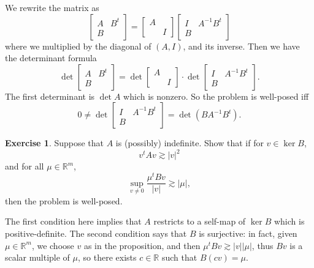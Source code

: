 \documentclass[10pt]{article}
\newcommand{\RR}{\mathbb{R}}
\theoremstyle{definition}
\newtheorem{exer}{Exercise}
\begin{document}
We rewrite the matrix as
$$\begin{bmatrix}A & B^t \\ B\end{bmatrix} = \begin{bmatrix}A \\ & I\end{bmatrix} \begin{bmatrix}I & A^{-1}B^t \\ B\end{bmatrix}$$
where we multiplied by the diagonal of $(A, I)$, and its inverse.
Then we have the determinant formula
$$\det \begin{bmatrix}A & B^t \\ B\end{bmatrix} = \det \begin{bmatrix}A \\ & I\end{bmatrix} \cdot \det \begin{bmatrix}I & A^{-1}B^t \\ B\end{bmatrix}.$$
The first determinant is $\det A$ which is nonzero. So the problem is well-posed iff
$$0 \neq \det \begin{bmatrix}I & A^{-1}B^t \\ B\end{bmatrix} = \det(BA^{-1}B^t).$$

\begin{exer}
Suppose that $A$ is (possibly) indefinite.
Show that if for $v \in \ker B$,
$$v^t A v \gtrsim |v|^2$$
and for all $\mu \in \RR^m$,
$$\sup_{v \neq 0} \frac{\mu^t Bv}{|v|} \gtrsim |\mu|,$$
then the problem is well-posed.
\end{exer}

The first condition here implies that $A$ restricts to a self-map of $\ker B$ which is positive-definite.
The second condition says that $B$ is surjective: in fact, given $\mu \in \RR^m$, we choose $v$ as in the proposition, and then $\mu^t Bv \gtrsim |v| |\mu|$, thus $Bv$ is a scalar multiple of $\mu$, so there exists $c \in \RR$ such that $B(cv) = \mu$.
\end{document}
